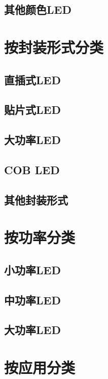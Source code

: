 \documentclass[12pt,UTF8]{ctexbook}
\begin{document}
\subsection{其他颜色LED}

\section{按封装形式分类}

\subsection{直插式LED}

\subsection{贴片式LED}

\subsection{大功率LED}

\subsection{COB LED}

\subsection{其他封装形式}

\section{按功率分类}

\subsection{小功率LED}

\subsection{中功率LED}

\subsection{大功率LED}

\section{按应用分类}
\end{document}
